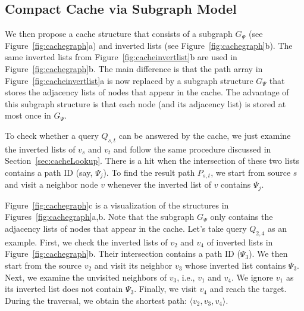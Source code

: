 \documentclass{sig-alternate}
\newcommand{\spath}{SP\xspace}
\begin{document}
\subsection{Compact Cache via Subgraph Model}\label{sec:cacheSubgraph}
%
We then propose a cache structure that consists of a subgraph $G_{\Psi}$ (see
Figure~\ref{fig:cachegraph}a) and inverted lists (see Figure~\ref{fig:cachegraph}b).
%
The same inverted lists from Figure~\ref{fig:cacheinvertlist}b are used in Figure~\ref{fig:cachegraph}b.
The main difference is that the path array in Figure~\ref{fig:cacheinvertlist}a is now replaced by
a subgraph structure $G_{\Psi}$ that stores the adjacency lists of nodes that appear in the cache.
The advantage of this subgraph structure is that each node (and its adjacency list) is stored at most once in $G_{\Psi}$.



To check whether a query $Q_{s,t}$ can be answered by the cache, we just examine the inverted lists of $v_s$ and $v_t$
and follow the same procedure discussed in Section~\ref{sec:cacheLookup}.
There is a hit when the intersection of these two lists contains a path ID (say, $\Psi_j$).
To find the result path $P_{s,t}$, we start from source $s$ and visit a neighbor node $v$ whenever the inverted list of $v$ contains
$\Psi_j$.


Figure~\ref{fig:cachegraph}c is a visualization of the structures in Figures~\ref{fig:cachegraph}a,b.
Note that the subgraph $G_{\Psi}$ only contains the adjacency lists of nodes that appear in the cache.
Let's take query $Q_{2,4}$ as an example.
First, we check the inverted lists of $v_2$ and $v_4$ of inverted lists in Figure~\ref{fig:cachegraph}b.
Their intersection contains a path ID ($\Psi_3$).
We then start from the source $v_2$ and visit its neighbor $v_3$ whose inverted list contains $\Psi_3$.
Next, we examine the unvisited neighbors of $v_3$, i.e., $v_1$ and $v_4$.
We ignore $v_1$ as its inverted list does not contain $\Psi_3$.
Finally, we visit $v_4$ and reach the target.
During the traversal, we obtain the shortest path: $\langle v_2, v_3, v_4 \rangle$.
\end{document}
